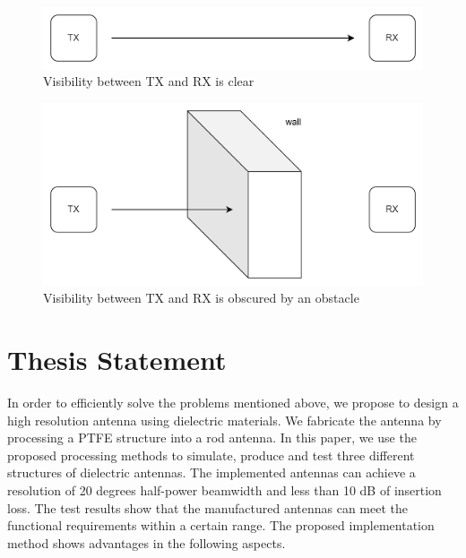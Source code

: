 \documentclass[a4paper,12pt]{report}
\begin{document}
\begin{figure}
  \begin{center}
    \includegraphics[clip, keepaspectratio, width=0.5\linewidth]{img/LOS.png}
    \caption{Visibility between TX and RX is clear}
    \label{fig:LOS}
  \end{center}
\end{figure}

\begin{figure}
  \begin{center}
    \includegraphics[clip, keepaspectratio, width=0.5\linewidth]{img/NLOS.png}
    \caption{Visibility between TX and RX is obscured by an obstacle}
    \label{fig:NLOS}
  \end{center}
\end{figure}

\section{Thesis Statement}

In order to efficiently solve the problems mentioned above,
we propose to design a high resolution antenna
using dielectric materials.
We fabricate the antenna by processing a PTFE structure into a rod antenna.
In this paper,
we use the proposed processing methods to simulate,
produce and test three different structures of dielectric antennas.
The implemented antennas can achieve a resolution of
20 degrees half-power beamwidth and less than 10 dB of
insertion loss.
The test results show that the manufactured antennas
can meet the functional requirements within a certain range.
The proposed implementation method shows
advantages in the following aspects.
\end{document}
